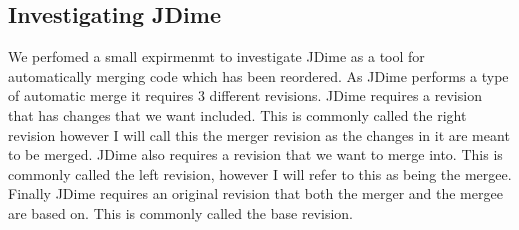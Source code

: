
\subsection{Investigating JDime}
We perfomed a small expirmenmt to investigate JDime as a tool for automatically merging code which has been reordered.
% 
% 
As JDime performs a type of automatic merge it requires 3 different revisions.
JDime requires a revision that has changes that we want included.  This is commonly called the right revision however I will call this the merger revision as the changes in it are meant to be merged.
JDime also requires a revision that we want to merge into.  This is commonly called the left revision, however I will refer to this as being the mergee. 
Finally JDime requires an original revision that both the merger and the mergee are based on.
This is commonly called the base revision.

